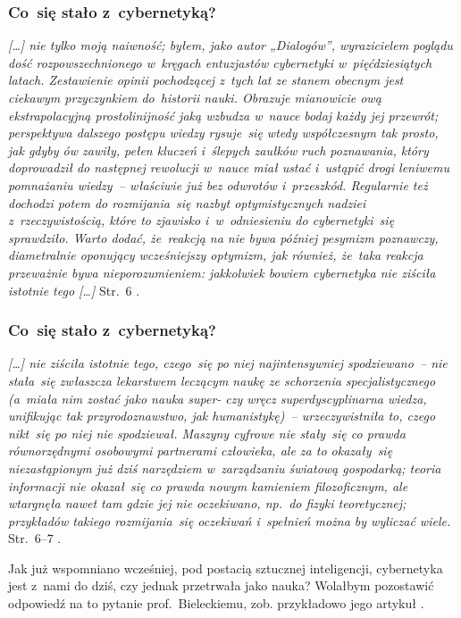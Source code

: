 \documentclass[10pt,t]{beamer}
\begin{document}
\begin{frame}
  \frametitle{Co~się stało z~cybernetyką?}


  \textit{[\ldots] nie tylko moją naiwność; byłem, jako autor „Dialogów”,
    wyrazicielem poglądu dość
    rozpowszechnionego w~kręgach entuzjastów cybernetyki w~pięćdziesiątych
    latach. Zestawienie opinii pochodzącej z~tych lat ze stanem obecnym jest
    ciekawym przyczynkiem do~historii nauki. Obrazuje mianowicie ową
    ekstrapolacyjną prostolinijność jaką wzbudza w~nauce bodaj każdy jej
    przewrót; perspektywa dalszego postępu wiedzy rysuje~się wtedy
    współczesnym tak prosto, jak gdyby ów zawiły, pełen kluczeń i~ślepych
    zaułków ruch poznawania, który doprowadził do następnej rewolucji
    w~nauce miał ustać i~ustąpić drogi leniwemu pomnażaniu wiedzy~--
    właściwie już bez odwrotów i~przeszkód. Regularnie też dochodzi potem
    do rozmijania~się nazbyt optymistycznych nadziei z~rzeczywistością,
    które to zjawisko i~w~odniesieniu do cybernetyki~się sprawdziło. Warto
    dodać, że~reakcją na nie bywa później pesymizm poznawczy, diametralnie
    oponujący wcześniejszy optymizm, jak również, że~taka reakcja przeważnie
    bywa nieporozumieniem: jakkolwiek bowiem cybernetyka nie ziściła
    istotnie tego [\ldots]}
  Str.~$6$ \parencite{Lem-Dialogi-Vol-I-Pub-1996}.

\end{frame}





\begin{frame}
  \frametitle{Co~się stało z~cybernetyką?}


  \textit{[\ldots] nie ziściła istotnie tego, czego~się po niej najintensywniej
    spodziewano~-- nie stała~się
    zwłaszcza lekarstwem leczącym naukę ze schorzenia specjalistycznego
    (a~miała nim zostać jako nauka super- czy
    wręcz superdyscyplinarna wiedza, unifikując tak przyrodoznawstwo, jak
    humanistykę)~-- urzeczywistniła to, czego nikt~się po niej nie
    spodziewał. Maszyny cyfrowe nie stały~się co prawda równorzędnymi
    osobowymi partnerami człowieka, ale za to okazały~się niezastąpionym już
    dziś narzędziem w~zarządzaniu światową gospodarką; teoria informacji nie
    okazał~się co prawda nowym kamieniem filozoficznym, ale wtargnęła nawet
    tam gdzie jej nie oczekiwano, np.~do fizyki teoretycznej; przykładów
    takiego rozmijania~się oczekiwań i~spełnień można by wyliczać wiele.}
  Str.~$6\text{--}7$ \parencite{Lem-Dialogi-Vol-I-Pub-1996}.

  Jak już wspomniano wcześniej, pod postacią sztucznej inteligencji,
  cybernetyka jest z~nami do dziś, czy jednak przetrwała jako nauka?
  Wolałbym pozostawić odpowiedź na to pytanie prof.~Bieleckiemu, zob.
  przykładowo jego artykuł
  \parencite{Bielecki-Cybernetyka-Slowniki-spoleczne-Vol-XIII-Ver-2025}.

\end{frame}
\end{document}
